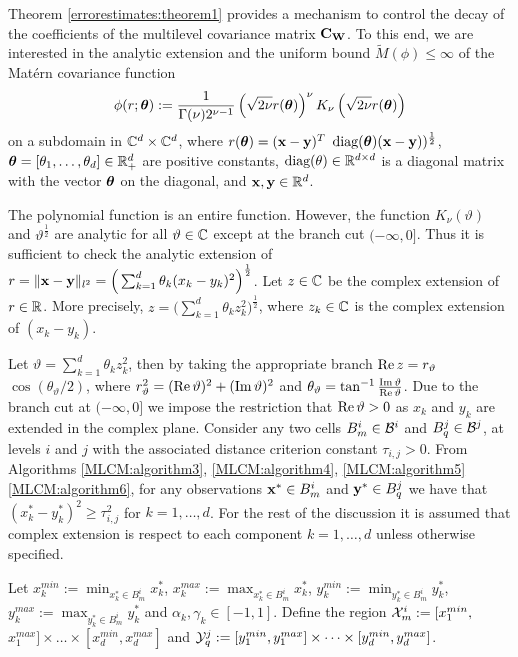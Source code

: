 \documentclass[11pt,final]{amsart}       %
\begin{document}
Theorem \ref{errorestimates:theorem1} provides a mechanism to control
the decay of the coefficients of the multilevel covariance matrix
$\mathbf{C}_{\mathbf{W}}$. To this end, we are interested in the analytic extension
and the uniform bound $\tilde M(\phi) \leq \infty$ of the Mat\'{e}rn
covariance function
\[
\phi(r;\boldsymbol{\theta}):=\frac{1}{\Gamma(\nu)2^{\nu-1}} \left(
\sqrt{2\nu} r(\boldsymbol{\theta}) \right)^{\nu} K_{\nu} \left(
\sqrt{2\nu} r(\boldsymbol{\theta}) \right)
\]
on a subdomain in $\mathbb{C}^{d} \times \mathbb{C}^{d}$, where $r(\boldsymbol{\theta}) =
(\mathbf{x}-\mathbf{y})^{T}$ $\text{diag}(\boldsymbol{\theta}) (\mathbf{x} - \mathbf{y})
)^{\frac{1}{2}}$, $\boldsymbol{\theta}=[\theta_1, \dots, \theta_d] \in
\Bbb{R}^{d}_{+}$ are positive constants, $\text{diag}(\theta) \in \Bbb{R}^{d
  \times d}$ is a diagonal matrix with the vector $\boldsymbol{\theta}$ on the
diagonal, and $\mathbf{x}, \mathbf{y} \in \Bbb{R}^{d}$.

The polynomial function is an entire function. However, the function
$K_{\nu}(\vartheta)$ and $\vartheta^{\frac{1}{2}}$ are analytic for
all $\vartheta \in \mathbb{C}$ except at the branch cut $(-\infty,0]$.  Thus
it is sufficient to check the analytic extension of $r = \|\mathbf{x} -
\mathbf{y}\|_{l^{2}} = \Big( \sum_{k=1}^{d} \theta_{k} (x_k - y_k)^{2}
\Big)^{\frac{1}{2}}$.  Let $z \in \mathbb{C}$ be the complex extension of
$r \in \Bbb{R}$. More precisely, $z = \Big( \sum_{k=1}^{d} \theta_{k}
z_k^{2} \Big)^{\frac{1}{2}}$, where $z_k \in \mathbb{C}$ is the complex
extension of $(x_k - y_k)$.

Let $\vartheta = \sum_{k=1}^{d} \theta_{k} z_k^{2}$, then by taking
the appropriate branch $\mathop{\text{\rm Re}} z = r_{\vartheta}$ $\cos{(
  \theta_{\vartheta}/2)}$, where $r^2_{\vartheta} = (\mathop{\text{\rm Re}}
\vartheta)^2 + (\mathop{\text{\rm Im}} \vartheta)^2$ and $\theta_{\vartheta} =
\tan^{-1} \frac{\mathop{\text{\rm Im}} \vartheta}{\mathop{\text{\rm Re}} \vartheta}$. Due to the branch
cut at $(-\infty,0]$ we impose the restriction that $\mathop{\text{\rm Re}} \vartheta >
0$ as $x_k$ and $y_k$ are extended in the complex plane.  Consider any
two cells $B^{i}_{m} \in {\mathcal B}^i$ and $B^{j}_{q} \in {\mathcal B}^j$, at levels
$i$ and $j$ with the associated distance criterion constant
$\tau_{i,j}>0$. From Algorithms \ref{MLCM:algorithm3},
\ref{MLCM:algorithm4}, \ref{MLCM:algorithm5} \ref{MLCM:algorithm6},
for any observations $\mathbf{x}^{*} \in B^{i}_{m}$ and $\mathbf{y}^{*} \in
B^{j}_{q}$ we have that $(x^*_k - y^*_k)^2 \geq \tau^2_{i,j}$ for $k =
1,\dots,d$.  For the rest of the discussion it is assumed that complex
extension is respect to each component $k = 1,\dots,d$ unless
otherwise specified.


Let $x^{min}_k := \min_{ x^*_k \in B^i_m} x^*_k$, $x^{max}_k := \max_{
  x^*_k \in B^i_m} x^*_k$, $y^{min}_k := \min_{ y^*_k \in B^i_m}
y^*_k$, $y^{max}_k := \max_{ y^*_k \in B^i_m} y^*_k$ and
$\alpha_k,\gamma_k \in [-1,1]$. Define the region $\mathcal{X}^{i}_{m} :=
[x^{min}_1,$ $x^{max}_1] \times \dots \times [x^{min}_d,x^{max}_d]$
and $\mathcal{Y}^{j}_{q} := [y^{min}_1,y^{max}_1] \times \dots \times
[y^{min}_d,y^{max}_d]$.
\end{document}
